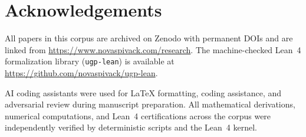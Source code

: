 \documentclass[11pt]{article}
\begin{document}
\section*{Acknowledgements}
All papers in this corpus are archived on Zenodo with permanent DOIs and
are linked from \url{https://www.novaspivack.com/research}.
The machine-checked Lean~4 formalization library (\texttt{ugp-lean}) is
available at \url{https://github.com/novaspivack/ugp-lean}.

AI coding assistants were used for \LaTeX{} formatting, coding assistance, and adversarial review during manuscript preparation. All mathematical derivations, numerical computations, and Lean~4 certifications across the corpus were independently verified by deterministic scripts and the Lean~4 kernel.







\end{document}
